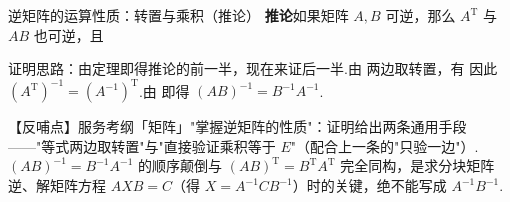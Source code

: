 \begin{fdeep}{逆矩阵的运算性质：转置与乘积（推论）}
\textbf{推论}\quad 如果矩阵 $A,B$ 可逆，那么 $A^{\mathrm{T}}$ 与 $AB$ 也可逆，且

证明思路：由定理即得推论的前一半，现在来证后一半.由
两边取转置，有
因此 $(A^{\mathrm{T}})^{-1}=(A^{-1})^{\mathrm{T}}$.由
即得 $(AB)^{-1}=B^{-1}A^{-1}$.

【反哺点】服务考纲「矩阵」"掌握逆矩阵的性质"：证明给出两条通用手段——"等式两边取转置"与"直接验证乘积等于 $E$"（配合上一条的"只验一边"）.$(AB)^{-1}=B^{-1}A^{-1}$ 的顺序颠倒与 $(AB)^{\mathrm{T}}=B^{\mathrm{T}}A^{\mathrm{T}}$ 完全同构，是求分块矩阵逆、解矩阵方程 $AXB=C$（得 $X=A^{-1}CB^{-1}$）时的关键，绝不能写成 $A^{-1}B^{-1}$.
\end{fdeep}



